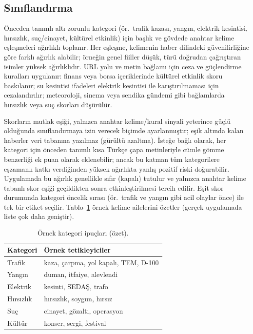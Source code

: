 \documentclass[conference,a4paper]{IEEEtran}
\begin{document}
\subsection{Sınıflandırma}
Önceden tanımlı altı zorunlu kategori (ör.\ trafik kazası, yangın, elektrik kesintisi, hırsızlık, suç/cinayet, kültürel etkinlik) için başlık ve gövdede anahtar kelime eşleşmeleri ağırlıklı toplanır. Her eşleşme, kelimenin haber dilindeki güvenilirliğine göre farklı ağırlık alabilir; örneğin genel fiiller düşük, türü doğrudan çağrıştıran isimler yüksek ağırlıklıdır. URL yolu ve metin bağlamı için ceza ve güçlendirme kuralları uygulanır: finans veya borsa içeriklerinde kültürel etkinlik skoru baskılanır; su kesintisi ifadeleri elektrik kesintisi ile karıştırılmaması için cezalandırılır; meteoroloji, sinema veya sendika gündemi gibi bağlamlarda hırsızlık veya suç skorları düşürülür.

Skorların mutlak eşiği, yalnızca anahtar kelime/kural sinyali yeterince güçlü olduğunda sınıflandırmaya izin verecek biçimde ayarlanmıştır; eşik altında kalan haberler veri tabanına yazılmaz (gürültü azaltma). İsteğe bağlı olarak, her kategori için önceden tanımlı kısa Türkçe çapa metinleriyle cümle gömme benzerliği ek puan olarak eklenebilir; ancak bu katman tüm kategorilere eşzamanlı katkı verdiğinden yüksek ağırlıkta yanlış pozitif riski doğurabilir. Uygulamada bu ağırlık genellikle sıfır (kapalı) tutulur ve yalnızca anahtar kelime tabanlı skor eşiği geçildikten sonra etkinleştirilmesi tercih edilir. Eşit skor durumunda kategori öncelik sırası (ör.\ trafik ve yangın gibi acil olaylar önce) ile tek bir etiket seçilir. Tablo~\ref{tab:cat} örnek kelime ailelerini özetler (gerçek uygulamada liste çok daha geniştir).

\begin{table}[!t]
\caption{Örnek kategori ipuçları (özet).}
\label{tab:cat}
\centering
\footnotesize
\begin{tabular}{@{}p{}p{}@{}}
\toprule
Kategori & Örnek tetikleyiciler \\
\midrule
Trafik & kaza, çarpma, yol kapalı, TEM, D-100 \\
Yangın & duman, itfaiye, alevlendi \\
Elektrik & kesinti, SEDAŞ, trafo \\
Hırsızlık & hırsızlık, soygun, hırsız \\
Suç & cinayet, gözaltı, operasyon \\
Kültür & konser, sergi, festival \\
\bottomrule
\end{tabular}
\end{table}
\end{document}

